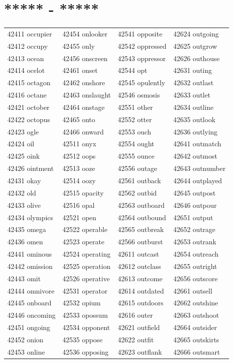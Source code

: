 \documentclass[10pt, oneside]{book}
\begin{document}
\begin{table}[h]
	\centering
	\section*{***** - *****}
	\begin{tabular}{l l l l}
42411 occupier &42454 onlooker &42541 opposite &42624 outgoing\\
42412 occupy &42455 only &42542 oppressed &42625 outgrow\\
42413 ocean &42456 onscreen &42543 oppressor &42626 outhouse\\
42414 ocelot &42461 onset &42544 opt &42631 outing\\
42415 octagon &42462 onshore &42545 opulently &42632 outlast\\
42416 octane &42463 onslaught &42546 osmosis &42633 outlet\\
42421 october &42464 onstage &42551 other &42634 outline\\
42422 octopus &42465 onto &42552 otter &42635 outlook\\
42423 ogle &42466 onward &42553 ouch &42636 outlying\\
42424 oil &42511 onyx &42554 ought &42641 outmatch\\
42425 oink &42512 oops &42555 ounce &42642 outmost\\
42426 ointment &42513 ooze &42556 outage &42643 outnumber\\
42431 okay &42514 oozy &42561 outback &42644 outplayed\\
42432 old &42515 opacity &42562 outbid &42645 outpost\\
42433 olive &42516 opal &42563 outboard &42646 outpour\\
42434 olympics &42521 open &42564 outbound &42651 output\\
42435 omega &42522 operable &42565 outbreak &42652 outrage\\
42436 omen &42523 operate &42566 outburst &42653 outrank\\
42441 ominous &42524 operating &42611 outcast &42654 outreach\\
42442 omission &42525 operation &42612 outclass &42655 outright\\
42443 omit &42526 operative &42613 outcome &42656 outscore\\
42444 omnivore &42531 operator &42614 outdated &42661 outsell\\
42445 onboard &42532 opium &42615 outdoors &42662 outshine\\
42446 oncoming &42533 opossum &42616 outer &42663 outshoot\\
42451 ongoing &42534 opponent &42621 outfield &42664 outsider\\
42452 onion &42535 oppose &42622 outfit &42665 outskirts\\
42453 online &42536 opposing &42623 outflank &42666 outsmart\\
	\end{tabular}
 \end{table}
\end{document}
